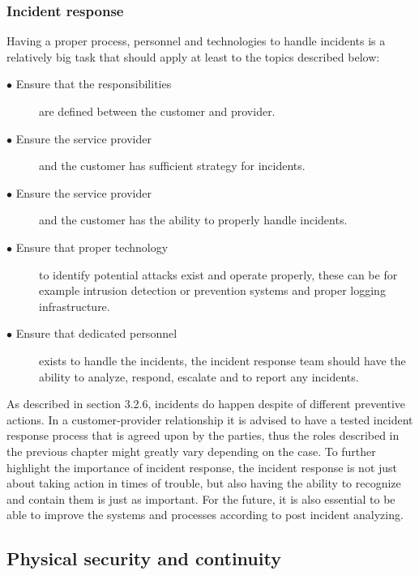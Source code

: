 \documentclass{article}
\begin{document}
\subsubsection{Incident response}
Having a proper process, personnel and technologies to handle incidents is a relatively big task that should apply at least to the topics described below:
\begin{description}
	\item[$\bullet$ Ensure that the responsibilities] are defined between the customer and provider.
	\item[$\bullet$ Ensure the service provider] and the customer has sufficient strategy for incidents.
	\item[$\bullet$ Ensure the service provider] and the customer has the ability to properly handle incidents.
	\item[$\bullet$ Ensure that proper technology] to identify potential attacks exist and operate properly, these can be for example intrusion detection or prevention systems and proper logging infrastructure.
	\item[$\bullet$ Ensure that dedicated personnel] exists to handle the incidents, the incident response team should have the ability to analyze, respond, escalate and to report any incidents.
\end{description}
\par
As described in section 3.2.6, incidents do happen despite of different preventive actions. In a customer-provider relationship it is advised to have a tested incident response process that is agreed upon by the parties, thus the roles described in the previous chapter might greatly vary depending on the case. To further highlight the importance of incident response, the incident response is not just about taking action in times of trouble, but also having the ability to recognize and contain them is just as important. For the future, it is also essential to be able to improve the systems and processes according to post incident analyzing.
\subsection{Physical security and continuity}
\end{document}
